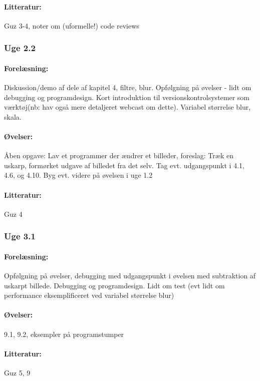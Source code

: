 \documentclass[12pt]{article}
\begin{document}
\paragraph{Litteratur:} Guz 3-4, noter om (uformelle!) code reviews

\subsubsection{Uge 2.2}
\paragraph{Forelæsning:} 

Diskussion/demo af dele af kapitel 4, filtre, blur.
Opfølgning på øvelser -  lidt om debugging og programdesign.
Kort introduktion til versionskontrolsystemer som værktøj(nb: hav også mere detaljeret webcast om dette).
Variabel størrelse blur, skala.

\paragraph{Øvelser:}
Åben opgave: Lav et programmer der ændrer et billeder, foreslag:
Træk en uskarp, formørket udgave af billedet fra det selv. Tag evt. udgangspunkt i 
4.1, 4.6, og 4.10.
Byg evt. videre på øvelsen i uge 1.2

\paragraph{Litteratur:} Guz 4
\subsubsection{Uge 3.1}
\paragraph{Forelæsning:} 
Opfølgning på øvelser, debugging med udgangspunkt i øvelsen med subtraktion af uskarpt billede.
Debugging og programdesign. Lidt om test
(evt lidt om performance eksemplificeret ved variabel størrelse blur)


\paragraph{Øvelser:}
9.1, 9.2, eksempler på programstumper
\paragraph{Litteratur:} Guz 5, 9
\end{document}
